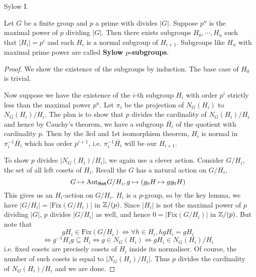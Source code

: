 \documentclass[../../book.tex]{subfiles}
\begin{document}
\begin{thm} Sylow I. 
    
    Let $G$ be a finite group and $p$ a prime with divides $|G|$. 
    Suppose $p^n$ is the maximal power of $p$ dividing $|G|$. 
    Then there exists subgroups $H_0, \cdots, H_n$ such that
    $|H_i| = p^i$ and each $H_i$ is a normal subgroup of $H_{i+1}$. 
    Subgroups like $H_n$ with maximal prime power are called 
    \textbf{Sylow $p$-subgroups}.
    
\end{thm}
\begin{proof}
    
    We show the existence of the subgroups by induction. 
    The base case of $H_0$ is trivial. 
    
    Now suppose we have the existence of the $i$-th subgroup $H_i$
    with order $p^i$ strictly less than the maximal power $p^n$. 
    Let $\pi_i$ be the projection of $N_G(H_i)$ to $N_G(H_i) / H_i$.
    The plan is to show that $p$ divides the cardinality of $N_G(H_i) / H_i$
    and hence by Cauchy's theorem, 
    we have a subgroup $\bar{H_i}$ of the quotient with cardinality $p$. 
    Then by the 3rd and 1st isomorphism theorem, 
    $H_i$ is normal in $\pi_i^{-1}\bar{H_i}$ which has order $p^{i+1}$,
    i.e. $\pi_i^{-1}\bar{H_i}$ will be our $H_{i+1}$. 
    
    To show $p$ divides $|N_G(H_i) / H_i|$, we again use a clever action.
    Consider $G / H_i$, the set of all left cosets of $H_i$.
    Recall the $G$ has a natural action on $G / H_i$, \[
        G \mapsto \mathrm{Aut}_{\mathbf{Set}}G / H_i, g \mapsto (g_0H \mapsto g g_0H)
    \]
    This gives us an $H_i$-action on $G / H_i$. 
    $H_i$ is a $p$-group, so by the key lemma,
    we have $|G / H_i| = |\mathrm{Fix}(G / H_i)|$ in $\mathbb{Z} / (p)$.
    Since $|H_i|$ is not the maximal power of $p$ dividing $|G|$,
    $p$ divides $|G / H_i|$ as well, 
    and hence $0 = |\mathrm{Fix}(G / H_i)|$ in $\mathbb{Z} / (p)$. 
    But note that \[
        gH_i \in \mathrm{Fix}(G / H_i) 
        \iff \forall h \in H_i, h gH_i = gH_i
    \]
    \[
        \iff g^{-1} H_i g \subseteq H_i
        \iff g \in N_G(H_i) 
        \iff gH_i \in N_G(H_i) / H_i
    \]
    i.e. fixed cosets are precisely cosets of $H_i$ inside its normaliser. 
    Of course, the number of such cosets is equal to $|N_G(H_i) / H_i|$.
    Thus $p$ divides the cardinality of $N_G(H_i) / H_i$ and we are done. 
    
\end{proof}
\end{document}
